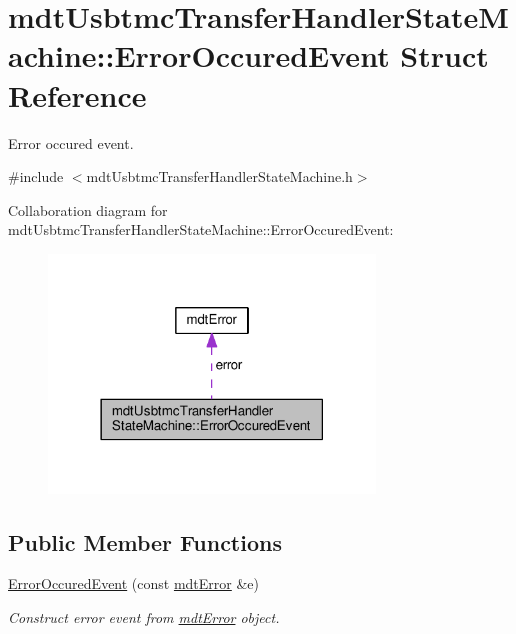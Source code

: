 \hypertarget{structmdt_usbtmc_transfer_handler_state_machine_1_1_error_occured_event}{\section{mdt\-Usbtmc\-Transfer\-Handler\-State\-Machine\-:\-:Error\-Occured\-Event Struct Reference}
\label{structmdt_usbtmc_transfer_handler_state_machine_1_1_error_occured_event}
}


Error occured event.  




{\ttfamily \#include $<$mdt\-Usbtmc\-Transfer\-Handler\-State\-Machine.\-h$>$}



Collaboration diagram for mdt\-Usbtmc\-Transfer\-Handler\-State\-Machine\-:\-:Error\-Occured\-Event\-:\nopagebreak
\begin{figure}[H]
\begin{center}
\leavevmode
\includegraphics[width=246pt]{structmdt_usbtmc_transfer_handler_state_machine_1_1_error_occured_event__coll__graph}
\end{center}
\end{figure}
\subsection*{Public Member Functions}
\begin{DoxyCompactItemize}
\item 
\hyperlink{structmdt_usbtmc_transfer_handler_state_machine_1_1_error_occured_event_aa13abdce6636b41fc2e6b919331316b7}{Error\-Occured\-Event} (const \hyperlink{classmdt_error}{mdt\-Error} \&e)
\begin{DoxyCompactList}\small\item\em Construct error event from \hyperlink{classmdt_error}{mdt\-Error} object. \end{DoxyCompactList}\end{DoxyCompactItemize}
